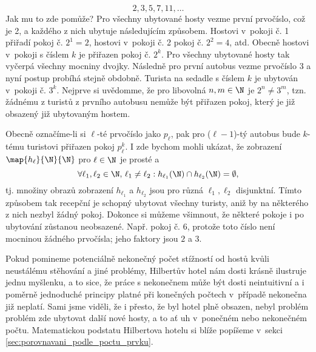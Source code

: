 \begin{enumerate}[label=\textit{(\roman*)}]
    \begin{equation*}
        2,3,5,7,11,\dots
    \end{equation*}
    Jak mu to zde pomůže? Pro všechny ubytované hosty vezme první prvočíslo, což je 2, a každého z nich ubytuje následujícím způsobem. Hostovi v~pokoji č. 1 přiřadí pokoj č. $2^1=2$, hostovi v~pokoji č. 2 pokoj č. $2^2=4$, atd. Obecně hostovi v~pokoji s číslem $k$ je přiřazen pokoj č. $2^k$. Pro všechny ubytované hosty tak vyčerpá všechny mocniny dvojky. Následně pro první autobus vezme prvočíslo 3 a nyní postup probíhá stejně obdobně. Turista na sedadle s číslem $k$ je ubytován v~pokoji č. $3^k$. Nejprve si uvědomme, že pro libovolná $n,m\in\N$ je $2^n\neq 3^m$, tzn. žádnému z turistů z prvního autobusu nemůže být přiřazen pokoj, který je již obsazený již ubytovaným hostem.\par
    Obecně označíme-li si $\ell$-té prvočíslo jako $p_\ell$, pak pro ($\ell-1$)-tý autobus bude $k$-tému turistovi přiřazen pokoj $p_\ell^k$. I zde bychom mohli ukázat, že zobrazení $\map{h_\ell}{\N}{\N}$ pro $\ell\in\N$ je prosté a
    \begin{equation*}
        \forall\ell_1,\ell_2\in\N,\,\ell_1\neq\ell_2: h_{\ell_1}(\N)\cap h_{\ell_2}(\N)=\emptyset,
    \end{equation*}
    tj. množiny obrazů zobrazení $h_{\ell_1}$ a $h_{\ell_2}$ jsou pro různá $\ell_1,\ell_2$ disjunktní. Tímto způsobem tak recepční je schopný ubytovat všechny turisty, aniž by na některého z nich nezbyl žádný pokoj. Dokonce si můžeme všimnout, že některé pokoje i po ubytování zůstanou neobsazené. Např. pokoj č. 6, protože toto číslo není mocninou žádného prvočísla; jeho faktory jsou $2$ a $3$.
\end{enumerate}
Pokud pomineme potenciálně nekonečný počet stížností od hostů kvůli neustálému stěhování a jiné problémy, Hilbertův hotel nám dosti krásně ilustruje jednu myšlenku, a to sice, že práce s nekonečnem může být dosti neintuitivní a i poměrně jednoduché principy platné při konečných počtech v~případě nekonečna již neplatí. Sami jsme viděli, že i přesto, že byl hotel plně obsazen, nebyl problém problém zde ubytovat další nové hosty, a to ať uh v~ponečném nebo nekonečném počtu. Matematickou podstatu Hilbertova hotelu si blíže popíšeme v~sekci \ref{sec:porovnavani_podle_poctu_prvku}.
